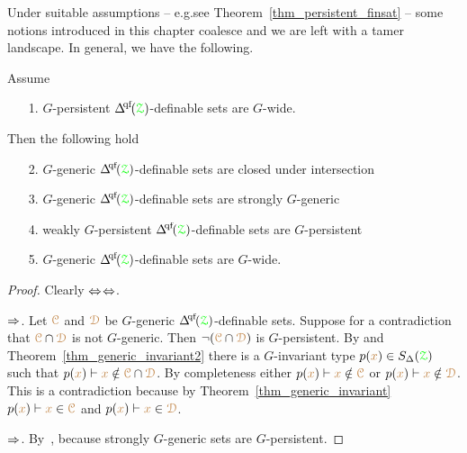 Under suitable assumptions -- e.g.\@ see Theorem~\ref{thm_persistent_finsat} -- some  notions introduced in this chapter coalesce and we are left with a tamer landscape.
In general, we have the following.


\begin{theorem}\label{thm_coalesce}
  Assume 
  \begin{itemize}
    \item[1.] $G$-persistent $\qfDelta({\grZ})$-definable sets are $G$-wide.
  \end{itemize}
  Then the following hold
  \begin{itemize}
    \item[2.] $G$-generic $\qfDelta({\grZ})$-definable sets are closed under intersection 
    \item[3.] $G$-generic $\qfDelta({\grZ})$-definable sets are strongly $G$-generic
    \item[4.] weakly $G$-persistent $\qfDelta({\grZ})$-definable sets are $G$-persistent
    \item[5.] $G$-generic $\qfDelta({\grZ})$-definable sets are $G$-wide.
  \end{itemize}
\end{theorem}

\begin{proof}
  Clearly $\Leftrightarrow$$\Leftrightarrow$.

  $\Rightarrow$.
  Let ${\color{brown}\EuScript C}$ and ${\color{brown}\EuScript D}$ be $G$-generic $\qfDelta({\grZ})$-definable sets.
  Suppose for a contradiction that ${\color{brown}\EuScript C}\cap{\color{brown}\EuScript D}$ is not $G$-generic.
  Then $\neg({\color{brown}\EuScript C}\cap{\color{brown}\EuScript D})$ is $G$-persistent.
  By  and Theorem~\ref{thm_generic_invariant2} there is a $G$-invariant type $p({\color{brown} x})\in S_\Delta({\color{green}\EuScript Z})$ such that $p({\color{brown} x})\vdash{\color{brown}x}\notin{\color{brown}\EuScript C}\cap{\color{brown}\EuScript D}$.
  By completeness either $p({\color{brown} x})\vdash{\color{brown}x}\notin{\color{brown}\EuScript C}$ or $p({\color{brown} x})\vdash{\color{brown}x}\notin{\color{brown}\EuScript D}$.
  This is a contradiction because by Theorem~\ref{thm_generic_invariant} $p({\color{brown} x})\vdash{\color{brown}x}\in{\color{brown}\EuScript C}$ and $p({\color{brown} x})\vdash{\color{brown}x}\in{\color{brown}\EuScript D}$.

  $\Rightarrow$.
  By~, because strongly $G$-generic sets are $G$-persistent.
\end{proof}

